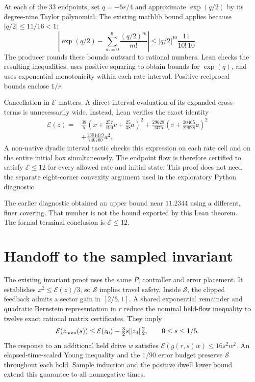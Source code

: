 \documentclass[10pt]{article}
\newcommand{\E}{\mathcal E}
\begin{document}
At each of the 33 endpoints, set $q=-5r/4$ and approximate $\exp(q/2)$ by its degree-nine Taylor polynomial. The existing mathlib bound applies because $|q/2|\le11/16<1$:
\[
\left|\exp(q/2)-\sum_{m=0}^{9}\frac{(q/2)^m}{m!}\right|
\le |q/2|^{10}\frac{11}{10!\,10}.
\]
The producer rounds these bounds outward to rational numbers. Lean checks the resulting inequalities, uses positive squaring to obtain bounds for $\exp(q)$, and uses exponential monotonicity within each rate interval. Positive reciprocal bounds enclose $1/r$.

Cancellation in $\E$ matters. A direct interval evaluation of its expanded cross terms is unnecessarily wide. Instead, Lean verifies the exact identity
\begin{align}
\E(z)={}&\frac{38}{5}\left(x+\frac{257}{190}v+\frac{25}{38}a\right)^2
+\frac{29628}{2375}\left(v+\frac{20465}{29628}a\right)^2\nonumber\\
&+\frac{1391479}{740700}a^2.\label{eq:ldl}
\end{align}
A non-native dyadic interval tactic checks this expression on each rate cell and on the entire initial box simultaneously. The endpoint flow is therefore certified to satisfy $\E\le12$ for every allowed rate and initial state. This proof does not need the separate eight-corner convexity argument used in the exploratory Python diagnostic.

The earlier diagnostic obtained an upper bound near $11.2344$ using a different, finer covering. That number is not the bound exported by this Lean theorem. The formal terminal conclusion is $\E\le12$.

\section{Handoff to the sampled invariant}
The existing invariant proof uses the same $P$, controller and error placement. It establishes $x^2\le\E(z)/3$, so $\mathcal S$ implies travel safety. Inside $\mathcal S$, the clipped feedback admits a sector gain in $[2/5,1]$. A shared exponential remainder and quadratic Bernstein representation in $r$ reduce the nominal held-flow inequality to twelve exact rational matrix certificates. They imply
\[
\E(z_{\rm nom}(s))\le\E(z_0)-\tfrac32s\|z_0\|_2^2,\qquad 0\le s\le1/5.
\]
The response to an additional held drive $w$ satisfies
$\E(g(r,s)w)\le16s^2w^2$. An elapsed-time-scaled Young inequality and the $1/90$ error budget preserve $\mathcal S$ throughout each hold. Sample induction and the positive dwell lower bound extend this guarantee to all nonnegative times.
\end{document}
